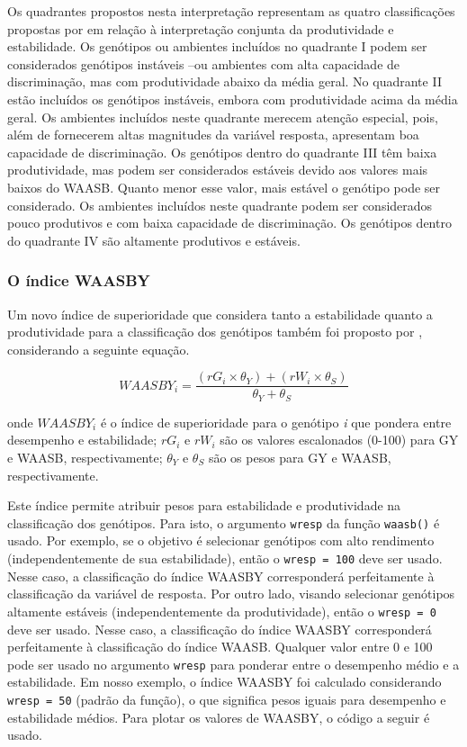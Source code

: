 \documentclass[
]{book}
\begin{document}
Os quadrantes propostos nesta interpretação representam as quatro classificações propostas por \citet{Olivoto2019} em relação à interpretação conjunta da produtividade e estabilidade. Os genótipos ou ambientes incluídos no quadrante I podem ser considerados genótipos instáveis --ou ambientes com alta capacidade de discriminação, mas com produtividade abaixo da média geral. No quadrante II estão incluídos os genótipos instáveis, embora com produtividade acima da média geral. Os ambientes incluídos neste quadrante merecem atenção especial, pois, além de fornecerem altas magnitudes da variável resposta, apresentam boa capacidade de discriminação. Os genótipos dentro do quadrante III têm baixa produtividade, mas podem ser considerados estáveis devido aos valores mais baixos do WAASB. Quanto menor esse valor, mais estável o genótipo pode ser considerado. Os ambientes incluídos neste quadrante podem ser considerados pouco produtivos e com baixa capacidade de discriminação. Os genótipos dentro do quadrante IV são altamente produtivos e estáveis.

\hypertarget{o-uxedndice-waasby}{%
\subsubsection{O índice WAASBY}\label{o-uxedndice-waasby}}

Um novo índice de superioridade que considera tanto a estabilidade quanto a produtividade para a classificação dos genótipos também foi proposto por \citet{Olivoto2019}, considerando a seguinte equação.

\[
WAASB{Y_i} = \frac{{\left( {r{G_i} \times {\theta _Y}} \right) + \left( {r{W_i} \times {\theta _S}} \right)}}{{{\theta _Y} + {\theta _S}}}
\]

onde \(WAASBY_i\) é o índice de superioridade para o genótipo \emph{i} que pondera entre desempenho e estabilidade; \(rG_i\) e \(rW_i\) são os valores escalonados (0-100) para GY e WAASB, respectivamente; \(\theta_Y\) e \(\theta_S\) são os pesos para GY e WAASB, respectivamente.

Este índice permite atribuir pesos para estabilidade e produtividade na classificação dos genótipos. Para isto, o argumento \texttt{wresp} da função \texttt{waasb()}  é usado. Por exemplo, se o objetivo é selecionar genótipos com alto rendimento (independentemente de sua estabilidade), então o \texttt{wresp\ =\ 100} deve ser usado. Nesse caso, a classificação do índice WAASBY corresponderá perfeitamente à classificação da variável de resposta. Por outro lado, visando selecionar genótipos altamente estáveis (independentemente da produtividade), então o \texttt{wresp\ =\ 0} deve ser usado. Nesse caso, a classificação do índice WAASBY corresponderá perfeitamente à classificação do índice WAASB. Qualquer valor entre 0 e 100 pode ser usado no argumento \texttt{wresp} para ponderar entre o desempenho médio e a estabilidade. Em nosso exemplo, o índice WAASBY foi calculado considerando \texttt{wresp\ =\ 50} (padrão da função), o que significa pesos iguais para desempenho e estabilidade médios. Para plotar os valores de WAASBY, o código a seguir é usado.
\end{document}
